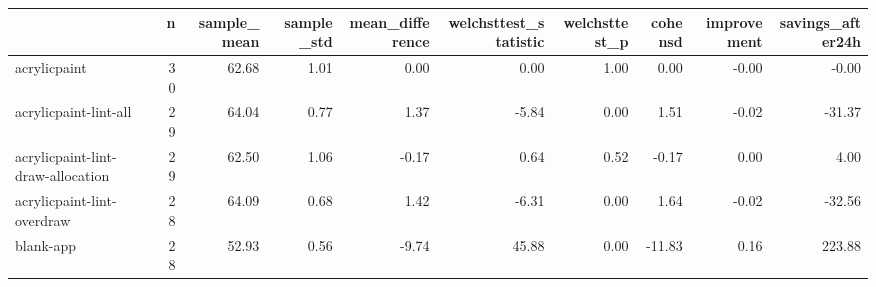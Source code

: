 \begin{tabular}{lrrrrrrrrr}
\toprule
{} &   n &  sample\_mean &  sample\_std &  mean\_difference &  welchsttest\_statistic &  welchsttest\_p &  cohensd &  improvement &  savings\_after24h \\
\midrule
acrylicpaint                      &  30 &        62.68 &        1.01 &             0.00 &                   0.00 &           1.00 &     0.00 &        -0.00 &             -0.00 \\
acrylicpaint-lint-all             &  29 &        64.04 &        0.77 &             1.37 &                  -5.84 &           0.00 &     1.51 &        -0.02 &            -31.37 \\
acrylicpaint-lint-draw-allocation &  29 &        62.50 &        1.06 &            -0.17 &                   0.64 &           0.52 &    -0.17 &         0.00 &              4.00 \\
acrylicpaint-lint-overdraw        &  28 &        64.09 &        0.68 &             1.42 &                  -6.31 &           0.00 &     1.64 &        -0.02 &            -32.56 \\
blank-app                         &  28 &        52.93 &        0.56 &            -9.74 &                  45.88 &           0.00 &   -11.83 &         0.16 &            223.88 \\
\bottomrule
\end{tabular}
